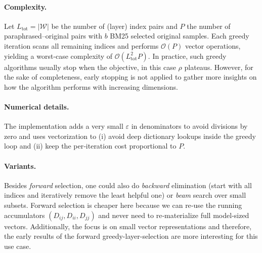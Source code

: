 \paragraph{Complexity.}
Let $L_\text{tot}=|\mathcal{W}|$ be the number of (layer) index pairs and $P$ the number of paraphrased–original pairs with $b$ BM25 selected original samples. Each greedy iteration scans all remaining indices and performs $\mathcal{O}(P)$ vector operations, yielding a worst‑case complexity of $\mathcal{O}(L_\text{tot}^2 P)$. In practice, such greedy algorithms usually stop when the objective, in this case $\rho$ plateaus. However, for the sake of completeness, early stopping is not applied to gather more insights on how the algorithm performs with increasing dimensions.

\paragraph{Numerical details.}
The implementation adds a very small $\varepsilon$ in denominators to avoid divisions by zero and uses vectorization to (i) avoid deep dictionary lookups inside the greedy loop and (ii) keep the per‑iteration cost proportional to $P$.

\paragraph{Variants.}
Besides \emph{forward} selection, one could also do \emph{backward} elimination (start with all indices and iteratively remove the least helpful one) or \emph{beam} search over small subsets. Forward selection is cheaper here because we can re‑use the running accumulators $(D_{ij},D_{ii},D_{jj})$ and never need to re‑materialize full model‑sized vectors. Additionally, the focus is on small vector representations and therefore, the early results of the forward greedy-layer-selection are more interesting for this use case.
